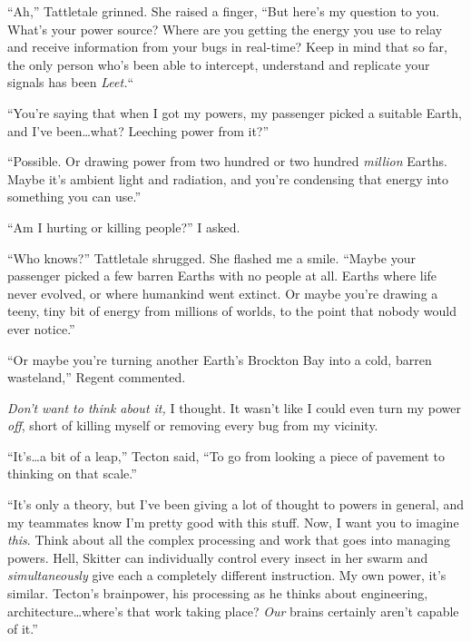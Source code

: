 ``Ah,'' Tattletale grinned.  She raised a finger, ``But here's my question to you.  What's your power source?  Where are you getting the energy you use to relay and receive information from your bugs in real-time?  Keep in mind that so far, the only person who's been able to intercept, understand and replicate your signals has been \emph{Leet.}``



``You're saying that when I got my powers, my passenger picked a suitable Earth, and I've been\ldots what?  Leeching power from it?''



``Possible.  Or drawing power from two hundred or two hundred \emph{million} Earths.  Maybe it's ambient light and radiation, and you're condensing that energy into something you can use.''



``Am I hurting or killing people?'' I asked.



``Who knows?'' Tattletale shrugged.  She flashed me a smile.  ``Maybe your passenger picked a few barren Earths with no people at all.  Earths where life never evolved, or where humankind went extinct.  Or maybe you're drawing a teeny, tiny bit of energy from millions of worlds, to the point that nobody would ever notice.''



``Or maybe you're turning another Earth's Brockton Bay into a cold, barren wasteland,'' Regent commented.



\emph{Don't want to think about it, }I thought.  It wasn't like I could even turn my power \emph{off}, short of killing myself or removing every bug from my vicinity.



``It's\ldots a bit of a leap,'' Tecton said, ``To go from looking a piece of pavement to thinking on that scale.''



``It's only a theory, but I've been giving a lot of thought to powers in general, and my teammates know I'm pretty good with this stuff.  Now, I want you to imagine \emph{this}.  Think about all the complex processing and work that goes into managing powers.  Hell, Skitter can individually control every insect in her swarm and \emph{simultaneously} give each a completely different instruction. My own power, it's similar.  Tecton's brainpower, his processing as he thinks about engineering, architecture\ldots where's that work taking place? \emph{ Our} brains certainly aren't capable of it.''



